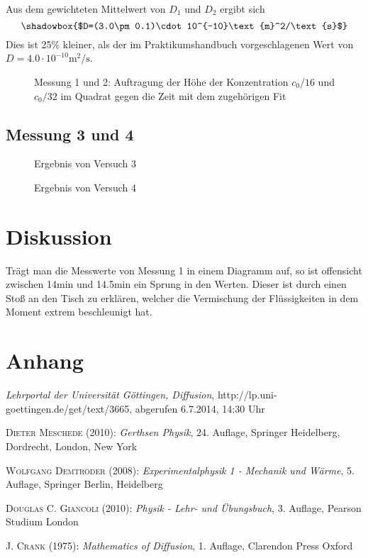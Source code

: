\documentclass[12pt,a4paper,titlepage,headinclude,bibtotoc]{scrartcl}
\begin{document}
Aus dem gewichteten Mittelwert von $D_1$ und $D_2$ ergibt sich 
$$\shadowbox{$D=(3.0\pm 0.1)\cdot 10^{-10}\text{m}^2/\text{s}$}$$
 Dies ist 25\% kleiner, als der im Praktikumshandbuch vorgeschlagenen Wert von $D=4.0\cdot 10^{-10}\text{m}^2/\text{s}$.
\begin{figure}[!h]
\centering

\caption{Messung 1 und 2: Auftragung der Höhe der Konzentration $c_0/16$ und $c_0/32$ im Quadrat gegen die Zeit mit dem zugehörigen Fit\label{fig:M12}}
\end{figure}

\subsection{Messung 3 und 4}
\begin{figure}[h!]
 \centering
 
 \caption{Ergebnis von Versuch 3}
\end{figure}
\begin{figure}[h!]
 \centering
 
 \caption{Ergebnis von Versuch 4}
\end{figure}

\section{Diskussion}
\label{sec:diskussion}
Trägt man die Messwerte von Messung 1 in einem Diagramm auf, so ist offensicht zwischen 14min und 14.5min ein Sprung in den Werten.
Dieser ist durch einen Stoß an den Tisch zu erklären, welcher die Vermischung der Flüssigkeiten in dem Moment extrem beschleunigt hat.



\section{Anhang}
\begin{thebibliography}{1000}

	\emph{Lehrportal der Universität Göttingen, Diffusion},
  http://lp.uni-goettingen.de/get/text/3665, abgerufen 6.7.2014, 14:30 Uhr

	\textsc{Dieter Meschede} (2010): \emph{Gerthsen Physik}, 24. Auflage, Springer Heidelberg,
Dordrecht, London, New York

	\textsc{Wolfgang Demtröder} (2008): \emph{Experimentalphysik 1 - Mechanik und Wärme}, 5. Auflage, Springer Berlin, Heidelberg


	\textsc{Douglas C. Giancoli} (2010): \emph{Physik - Lehr- und Übungsbuch}, 3. Auflage, Pearson Studium London

	\textsc{J. Crank} (1975): \emph{Mathematics of Diffusion}, 1. Auflage, Clarendon Press Oxford
	
\end{thebibliography}
\end{document}
